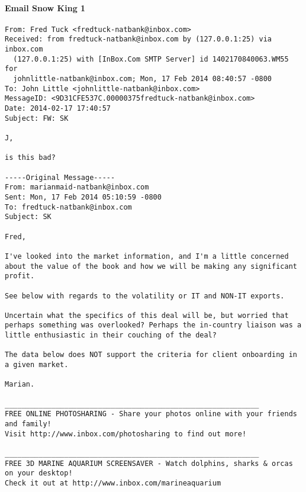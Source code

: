 \paragraph{Email Snow King 1}
\label{SnowKing1}
\begin{verbatim}
From: Fred Tuck <fredtuck-natbank@inbox.com>
Received: from fredtuck-natbank@inbox.com by (127.0.0.1:25) via inbox.com
  (127.0.0.1:25) with [InBox.Com SMTP Server] id 1402170840063.WM55 for
  johnlittle-natbank@inbox.com; Mon, 17 Feb 2014 08:40:57 -0800
To: John Little <johnlittle-natbank@inbox.com>
MessageID: <9D31CFE537C.00000375fredtuck-natbank@inbox.com>
Date: 2014-02-17 17:40:57
Subject: FW: SK

J,

is this bad?

-----Original Message-----
From: marianmaid-natbank@inbox.com
Sent: Mon, 17 Feb 2014 05:10:59 -0800
To: fredtuck-natbank@inbox.com
Subject: SK

Fred,

I've looked into the market information, and I'm a little concerned about the value of the book and how we will be making any significant profit.

See below with regards to the volatility or IT and NON-IT exports. 

Uncertain what the specifics of this deal will be, but worried that perhaps something was overlooked? Perhaps the in-country liaison was a little enthusiastic in their couching of the deal?

The data below does NOT support the criteria for client onboarding in a given market.

Marian.

____________________________________________________________
FREE ONLINE PHOTOSHARING - Share your photos online with your friends and family!
Visit http://www.inbox.com/photosharing to find out more!

____________________________________________________________
FREE 3D MARINE AQUARIUM SCREENSAVER - Watch dolphins, sharks & orcas on your desktop!
Check it out at http://www.inbox.com/marineaquarium
\end{verbatim}

